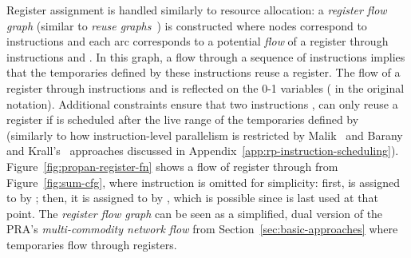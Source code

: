 \documentclass[acmsmall,authorversion,nonacm]{acmart}
\newcommand{\var}[2]{}
\begin{document}
Register assignment is handled similarly to resource allocation: a
\emph{register flow graph} (similar to \emph{reuse
  graphs}~\cite{Berson1996,Touati2002}) is constructed where nodes
correspond to instructions and each arc  corresponds
to a potential \emph{flow} of a register through instructions  and
.
In this graph, a flow through a sequence of instructions implies that
the temporaries defined by these instructions reuse a register.
The flow of a register through instructions  and  is reflected
on the 0-1 variables \var{r}{i,j} ( in the original
notation).
Additional constraints ensure that two instructions ,  can only
reuse a register if  is scheduled after the live range of the
temporaries defined by~ (similarly to how instruction-level
parallelism is restricted by Malik~\cite{Malik2008c} and Barany and
Krall's~\cite{Barany2013} approaches discussed in
Appendix~\ref{app:rp-instruction-scheduling}).
Figure~\ref{fig:propan-register-fn} shows a flow of register
 through  from Figure~\ref{fig:sum-cfg}, where
instruction  is omitted for simplicity: first,
 is assigned to  by ; then, it
is assigned to  by , which is possible
since  is last used at that point.
The \emph{register flow graph} can be seen as a simplified, dual
version of the PRA's \emph{multi-commodity network flow} from
Section~\ref{sec:basic-approaches} where temporaries flow through
registers.
\end{document}
